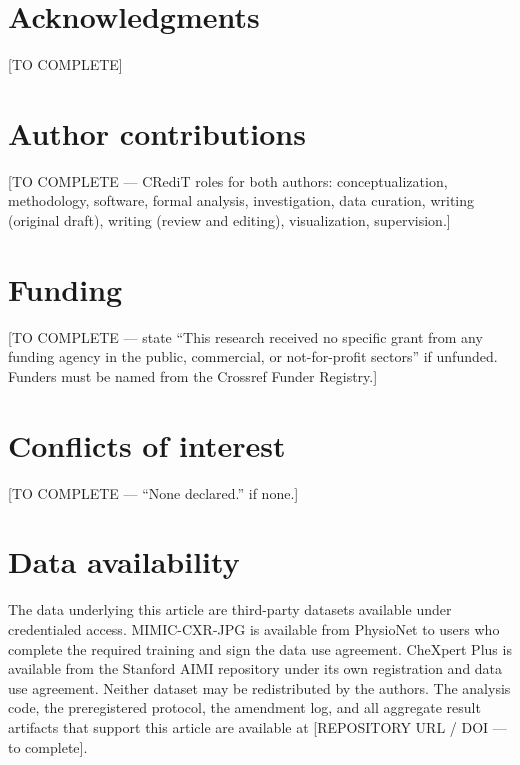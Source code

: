 \documentclass[12pt,a4paper]{article}
\begin{document}
\clearpage








\clearpage
\section*{Acknowledgments}
[TO COMPLETE]

\section*{Author contributions}
[TO COMPLETE --- CRediT roles for both authors: conceptualization, methodology,
software, formal analysis, investigation, data curation, writing (original
draft), writing (review and editing), visualization, supervision.]

\section*{Funding}
[TO COMPLETE --- state ``This research received no specific grant from any
funding agency in the public, commercial, or not-for-profit sectors'' if
unfunded. Funders must be named from the Crossref Funder Registry.]

\section*{Conflicts of interest}
[TO COMPLETE --- ``None declared.'' if none.]

\section*{Data availability}
The data underlying this article are third-party datasets available under
credentialed access. MIMIC-CXR-JPG is available from PhysioNet to users who
complete the required training and sign the data use agreement. CheXpert Plus
is available from the Stanford AIMI repository under its own registration and
data use agreement. Neither dataset may be redistributed by the authors. The
analysis code, the preregistered protocol, the amendment log, and all aggregate
result artifacts that support this article are available at [REPOSITORY URL /
DOI --- to complete].
\end{document}
